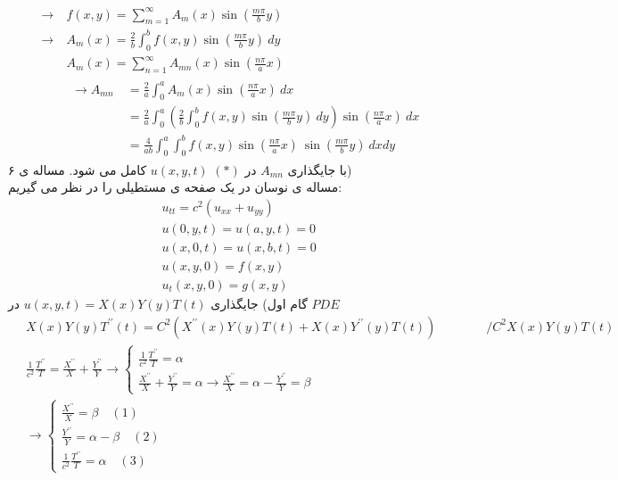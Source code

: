 \begin{equation*}
	\begin{aligned}
		{} 
		\rightarrow&\ f(x,y)=\sum_{m=1}^{\infty} A_{m}(x) \sin \left(\frac{m \pi }{b}y\right)
		\\ 
		\rightarrow &\ A_{m}(x)=\frac{2}{b}\int_{0}^{b}  f(x,y) \sin\left( \frac{m \pi }{b}y\right) \ dy
		\\ &\
		A_{m}(x)=\sum_{n=1}^{\infty} A_{mn}(x) \sin \left(\frac{n \pi }{a}x\right)
		\\ &\
		\begin{aligned}
			\rightarrow A_{mn} {} &\
			=\frac{2}{a}\int_{0}^{a} A_{m}(x) \sin \left(\frac{n \pi }{a}x\right) \ dx
			\\ &\
			=\frac{2}{a}\int_{0}^{a}\left(\frac{2}{b}\int_{0}^{b}  f(x,y) \sin \left(\frac{m \pi }{b}y\right) \ dy \right) \sin \left(\frac{n \pi }{a}x\right) \ dx
			\\ &\
			=\frac{4}{ab}\int_{0}^{a}\int_{0}^{b}  f(x,y)\sin\left( \frac{n \pi }{a}x\right) \ \sin \left(\frac{m \pi }{b}y\right) \ dx dy
		\end{aligned}
	\end{aligned}
\end{equation*}
با جایگذاری
$A_{mn}$
در
$(*)$
\quad
$u(x,y,t)$
کامل می شود.
مساله ی ۶) \\
مساله ی نوسان در یک صفحه ی مستطیلی را در نظر می گیریم:
\begin{equation*}
	\begin{aligned}
		{} &\
		u_{tt}= c^{2}\left(u_{xx} + u_{yy}\right)
		\\ &\
		u(0,y,t)= u(a,y,t)=0
		\\ &\
		u(x,0,t)=u(x,b,t)=0
		\\ &\
		u(x,y,0)=f(x,y)
		\\ &\
		u_{t}(x,y,0)=g(x,y)
	\end{aligned}
\end{equation*}
گام اول) جایگذاری 
$u(x,y,t)=X(x)Y(y)T(t)$
در 
$PDE$
\begin{equation*}
	\begin{aligned}
		{} &\
		X(x) Y(y) T^{\prime \prime}(t)=C^{2}\left(X^{\prime \prime}(x) Y(y) T(t)+X(x) Y^{\prime \prime}(y) T(t)\right) \quad\quad\quad\quad /C^{2}X(x)Y(y)T(t)
		\\ &\
		\frac{1}{c^{2}}\frac{T^{\prime \prime}}{T}=\frac{X^{\prime \prime}}{X}+\frac{Y^{\prime \prime}}{Y} \rightarrow\left\{\begin{array}{l}\frac{1}{c^{2}}\frac{T^{\prime \prime}}{T}=\alpha \\ \frac{X^{\prime \prime}}{X}+\frac{Y^{\prime \prime}}{Y}=\alpha \rightarrow \frac{X^{\prime \prime}}{X}=\alpha-\frac{Y^{\prime \prime}}{Y}=\beta\end{array}\right.
		\\ &\
		\rightarrow\left\{\begin{array}{l} \frac{X^{\prime \prime}}{X}=\beta \quad (1) \\ \frac{Y^{\prime \prime}}{Y}=\alpha-\beta\quad(2) \\ \frac{1}{c^{2}}\frac{T^{\prime \prime}}{T}=\alpha\quad(3) \end{array}\right.
	\end{aligned}
\end{equation*}

